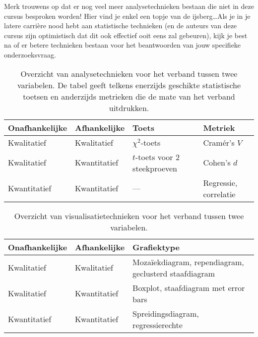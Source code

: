Merk trouwens op dat er nog veel meer analysetechnieken bestaan die niet in deze cursus besproken worden! Hier vind je enkel een topje van de ijsberg\ldots Als je in je latere carrière nood hebt aan statistische technieken (en de auteurs van deze cursus zijn optimistisch dat dit ook effectief ooit eens zal gebeuren), kijk je best na of er betere technieken bestaan voor het beantwoorden van jouw specifieke onderzoeksvraag.

\begin{table}
  \begin{tabular}{llll}
    \toprule
    \textbf{Onafhankelijke} & \textbf{Afhankelijke} & \textbf{Toets}                & \textbf{Metriek}      \\
    \midrule
    Kwalitatief             & Kwalitatief           & $\chi^2$-toets                & Cramér's $V$          \\
    Kwalitatief             & Kwantitatief          & $t$-toets voor 2 steekproeven & Cohen's $d$           \\
    Kwantitatief            & Kwantitatief          & ---                           & Regressie, correlatie \\
    \bottomrule
  \end{tabular}
  \caption{Overzicht van analysetechnieken voor het verband tussen twee variabelen. De tabel geeft telkens enerzijds geschikte statistische toetsen en anderzijds metrieken die de mate van het verband uitdrukken.}
  \label{tab:analyse2var}
\end{table}

\begin{table}
  \begin{tabular}{lll}
  	\toprule
  	\textbf{Onafhankelijke} & \textbf{Afhankelijke} & \textbf{Grafiektype}                                  \\
  	\midrule
  	Kwalitatief             & Kwalitatief           & Mozaïekdiagram, rependiagram, geclusterd staafdiagram \\
  	Kwalitatief             & Kwantitatief          & Boxplot, staafdiagram met error bars                  \\
  	Kwantitatief            & Kwantitatief          & Spreidingsdiagram, regressierechte                    \\
  	\bottomrule
  \end{tabular}
  \caption{Overzicht van visualisatietechnieken voor het verband tussen twee variabelen.}
  \label{tab:visualisatie2var}
\end{table}

